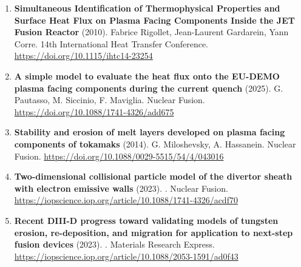 \documentclass[11pt,a4paper]{article}
\begin{document}
\begin{enumerate}[leftmargin=1.4em]
\item \textbf{Simultaneous Identification of Thermophysical Properties and Surface Heat Flux on Plasma Facing Components Inside the JET Fusion Reactor} (2010). Fabrice Rigollet, Jean-Laurent Gardarein, Yann Corre. 14th International Heat Transfer Conference. \url{https://doi.org/10.1115/ihtc14-23254}
\item \textbf{A simple model to evaluate the heat flux onto the EU-DEMO plasma facing components during the current quench} (2025). G. Pautasso, M. Siccinio, F. Maviglia. Nuclear Fusion. \url{https://doi.org/10.1088/1741-4326/add675}
\item \textbf{Stability and erosion of melt layers developed on plasma facing components of tokamaks} (2014). G. Miloshevsky, A. Hassanein. Nuclear Fusion. \url{https://doi.org/10.1088/0029-5515/54/4/043016}
\item \textbf{Two-dimensional collisional particle model of the divertor sheath with electron emissive walls} (2023). . Nuclear Fusion. \url{https://iopscience.iop.org/article/10.1088/1741-4326/acdf70}
\item \textbf{Recent DIII-D progress toward validating models of tungsten erosion, re-deposition, and migration for application to next-step fusion devices} (2023). . Materials Research Express. \url{https://iopscience.iop.org/article/10.1088/2053-1591/ad0f43}
\end{enumerate}
\end{document}
